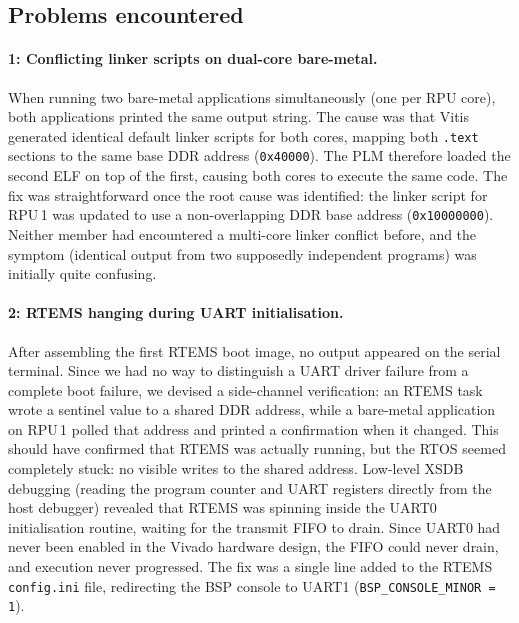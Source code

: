 \documentclass[10pt,a4]{article}
\begin{document}
\subsection{Problems encountered}
\label{sec:problems}

\paragraph{1: Conflicting linker scripts on dual-core bare-metal.}
When running two bare-metal applications simultaneously (one per RPU core),
both applications printed the same output string.
The cause was that Vitis generated identical default linker scripts for both
cores, mapping both \texttt{.text} sections to the same base DDR address
(\texttt{0x40000}).
The PLM therefore loaded the second ELF on top of the first, causing both
cores to execute the same code.
The fix was straightforward once the root cause was identified: the linker
script for RPU\,1 was updated to use a non-overlapping DDR base address
(\texttt{0x10000000}).
Neither member had encountered a multi-core linker conflict before, and the
symptom (identical output from two supposedly independent programs) was
initially quite confusing.

\paragraph{2: RTEMS hanging during UART initialisation.}
After assembling the first RTEMS boot image, no output appeared on the serial
terminal.
Since we had no way to distinguish a UART driver failure from a complete boot
failure, we devised a side-channel verification: an RTEMS task wrote a sentinel
value to a shared DDR address, while a bare-metal application on RPU\,1 polled
that address and printed a confirmation when it changed.
This should have confirmed that RTEMS was actually running, but the RTOS seemed completely 
stuck: no visible writes to the shared address.
Low-level XSDB debugging (reading the program counter and UART registers
directly from the host debugger) revealed that RTEMS was spinning inside the
UART0 initialisation routine, waiting for the transmit FIFO to drain.
Since UART0 had never been enabled in the Vivado hardware design, the FIFO
could never drain, and execution never progressed.
The fix was a single line added to the RTEMS \texttt{config.ini} file,
redirecting the BSP console to UART1 (\texttt{BSP\_CONSOLE\_MINOR = 1}).
\end{document}
